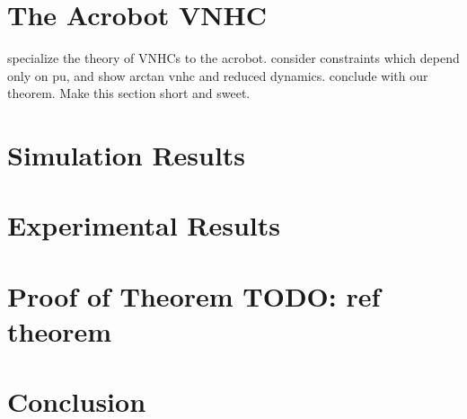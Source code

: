 \documentclass[journal,twoside,web]{ieeecolor}
\begin{document}
\section{The Acrobot VNHC}\label{sec:acrobot}
specialize the theory of VNHCs to the acrobot. consider constraints which depend
only on pu, and show arctan vnhc and reduced dynamics. conclude with our
theorem. Make this section short and sweet.

\section{Simulation Results}\label{sec:simulations}

\section{Experimental Results}\label{sec:experiments}

\section{Proof of Theorem \textbf{TODO: ref theorem}}\label{sec:proof}

\section{Conclusion}\label{sec:conclusion}



\end{document}
